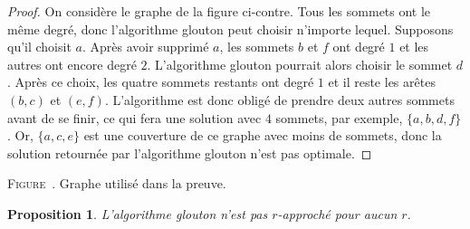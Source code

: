 \documentclass[a4paper,11pt]{amsart}
\theoremstyle{plain}
\newtheorem*{prop}{Proposition}
\begin{document}
\noindent\begin{minipage}{0.71\textwidth}
\begin{proof}
On considère le graphe de la figure ci-contre. Tous les sommets ont le même degré, donc l'algorithme glouton peut choisir n'importe lequel. Supposons qu'il choisit $a$. Après avoir supprimé $a$, les sommets $b$ et $f$ ont degré $1$ et les autres ont encore degré $2$. L'algorithme glouton pourrait alors choisir le sommet $d$. Après ce choix, les quatre sommets restants ont degré $1$ et il reste les arêtes $(b, c)$ et $(e, f)$. L'algorithme est donc obligé de prendre deux autres sommets avant de se finir, ce qui fera une solution avec $4$ sommets, par exemple, $\{a, b, d, f\}$. Or, $\{a, c, e\}$ est une couverture de ce graphe avec moins de sommets, donc la solution retournée par l'algorithme glouton n'est pas optimale.
\end{proof}
\end{minipage}\hfill\begin{minipage}{0.27\textwidth}
\centering
\resizebox{\textwidth}{!}{}

\textsc{Figure}~\thefigure. Graphe utilisé dans la preuve.
\end{minipage}

\begin{prop}
L'algorithme glouton n'est pas $r$-approché pour aucun $r$.
\end{prop}
\end{document}
